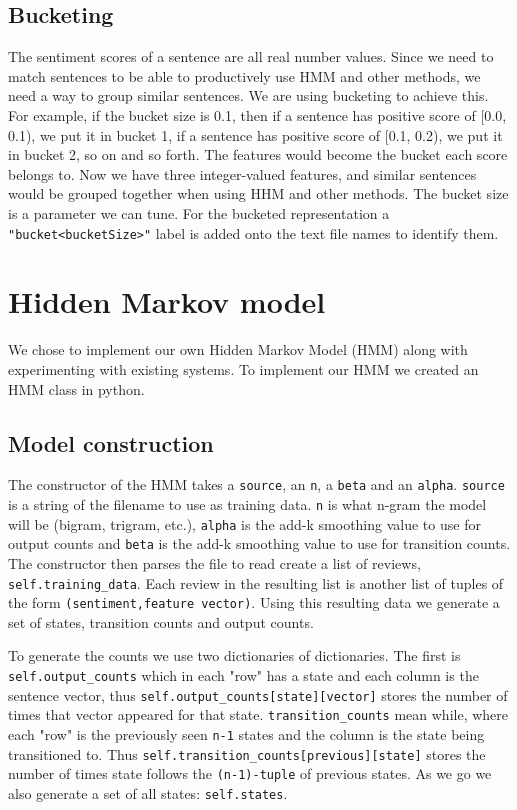 \documentclass{article}
\begin{document}
\subsection{Bucketing}
The sentiment scores of a sentence are all real number values. Since we need to match sentences to be able to productively use HMM and other methods, we need a way to group similar sentences. We are using bucketing to achieve this. For example, if the bucket size is 0.1, then if a sentence has positive score of [0.0, 0.1), we put it in bucket 1, if a sentence has positive score of [0.1, 0.2), we put it in bucket 2, so on and so forth. The features would become the bucket each score belongs to. Now we have three integer-valued features, and similar sentences would be grouped together when using HHM and other methods. The bucket size is a parameter we can tune. For the bucketed representation a \texttt{"bucket<bucketSize>"} label is added onto the text file names to identify them.


\section{Hidden Markov model}
We chose to implement our own Hidden Markov Model (HMM) along with experimenting with existing systems. To implement our HMM we created an HMM class in python.

\subsection{Model construction}
The constructor of the HMM takes a \texttt{source}, an \texttt{n}, a \texttt{beta} and an \texttt{alpha}. \texttt{source} is a string of the filename to use as training data. \texttt{n} is what n-gram the model will be (bigram, trigram, etc.), \texttt{alpha} is the add-k smoothing value to use for output counts and \texttt{beta} is the add-k smoothing value to use for transition counts. The constructor then parses the file to read create a list of reviews, \texttt{self.training\_data}. Each review in the resulting list is another list of tuples of the form \texttt{(sentiment,feature vector)}. Using this resulting data we generate a set of states, transition counts and output counts.

To generate the counts we use two dictionaries of dictionaries. The first is \texttt{self.output\_counts} which in each "row" has a state and each column is the sentence vector, thus \texttt{self.output\_counts[state][vector]} stores the number of times that vector appeared for that state. \texttt{transition\_counts} mean while, where each "row" is the previously seen \texttt{n-1} states and the column is the state being transitioned to. Thus \texttt{self.transition\_counts[previous][state]} stores the number of times state follows the \texttt{(n-1)-tuple} of previous states. As we go we also generate a set of all states: \texttt{self.states}.
\end{document}
